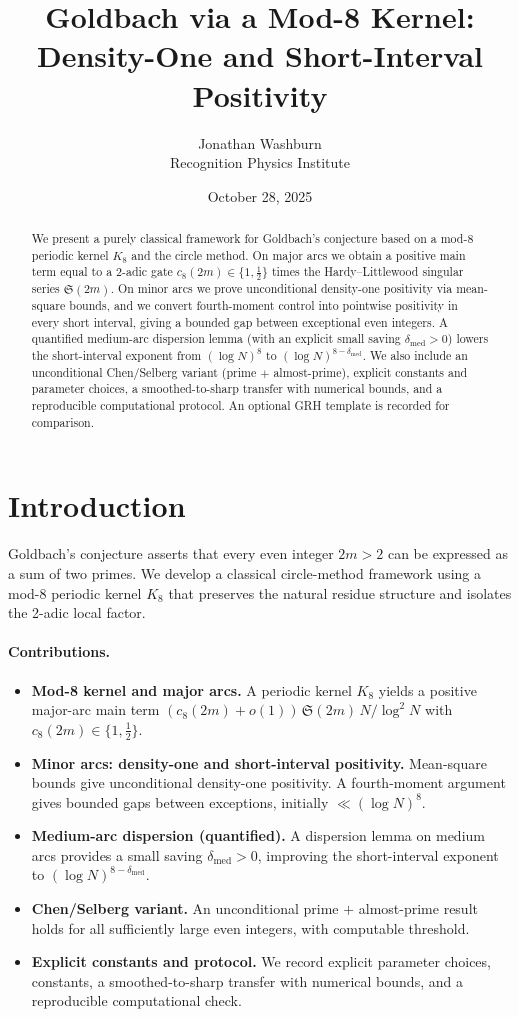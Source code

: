 \documentclass[11pt]{article}
\title{Goldbach via a Mod-8 Kernel: Density-One and Short-Interval Positivity}
\author{Jonathan Washburn\\Recognition Physics Institute}
\date{October 28, 2025}
\theoremstyle{definition}
\theoremstyle{remark}
\begin{document}
\maketitle

\begin{abstract}
We present a purely classical framework for Goldbach's conjecture based on a mod-8 periodic kernel $K_8$ and the circle method. On major arcs we obtain a positive main term equal to a $2$-adic gate $c_8(2m)\in\{1,\tfrac12\}$ times the Hardy--Littlewood singular series $\mathfrak S(2m)$. On minor arcs we prove unconditional density-one positivity via mean-square bounds, and we convert fourth-moment control into pointwise positivity in every short interval, giving a bounded gap between exceptional even integers. A quantified medium-arc dispersion lemma (with an explicit small saving $\delta_{\mathrm{med}}>0$) lowers the short-interval exponent from $(\log N)^8$ to $(\log N)^{8-\delta_{\mathrm{med}}}$. We also include an unconditional Chen/Selberg variant (prime $+$ almost-prime), explicit constants and parameter choices, a smoothed-to-sharp transfer with numerical bounds, and a reproducible computational protocol. An optional GRH template is recorded for comparison.
\end{abstract}

\section{Introduction}
Goldbach's conjecture asserts that every even integer $2m>2$ can be expressed as a sum of two primes. We develop a classical circle-method framework using a mod-8 periodic kernel $K_8$ that preserves the natural residue structure and isolates the 2-adic local factor.

\paragraph{Contributions.}
\begin{itemize}
  \item \textbf{Mod-8 kernel and major arcs.} A periodic kernel $K_8$ yields a positive major-arc main term $(c_8(2m)+o(1))\,\mathfrak S(2m)\,N/\log^2N$ with $c_8(2m)\in\{1,\tfrac12\}$.
  \item \textbf{Minor arcs: density-one and short-interval positivity.} Mean-square bounds give unconditional density-one positivity. A fourth-moment argument gives bounded gaps between exceptions, initially $\ll (\log N)^8$.
  \item \textbf{Medium-arc dispersion (quantified).} A dispersion lemma on medium arcs provides a small saving $\delta_{\mathrm{med}}>0$, improving the short-interval exponent to $(\log N)^{8-\delta_{\mathrm{med}}}$.
  \item \textbf{Chen/Selberg variant.} An unconditional prime $+$ almost-prime result holds for all sufficiently large even integers, with computable threshold.
  \item \textbf{Explicit constants and protocol.} We record explicit parameter choices, constants, a smoothed-to-sharp transfer with numerical bounds, and a reproducible computational check.
\end{itemize}
\end{document}
